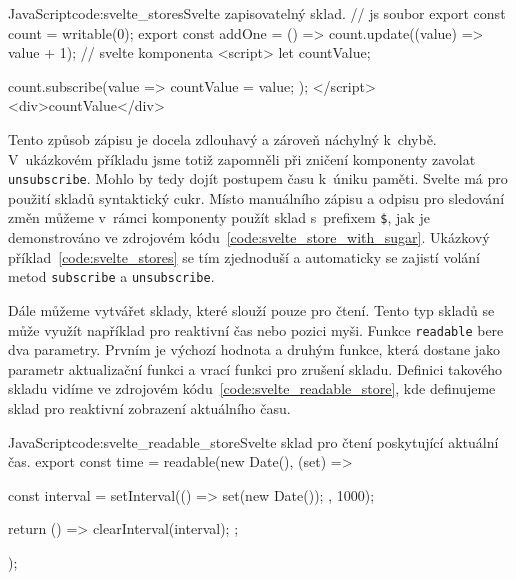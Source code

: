 \documentclass[
  master,
  program=ainf,
  printversion,
  tables=false,
  sourcecodes,
  glossaries,
  index
]{kidiplom}
\begin{document}
  \begin{kicode}{JavaScript}{code:svelte_stores}{Svelte zapisovatelný sklad.}
    // js soubor
    export const count = writable(0);
    export const addOne = () => count.update((value) => value + 1);
    // svelte komponenta
    <script>
      let countValue;

      count.subscribe(value => {
        countValue = value;
      });
    </script>
    <div>{countValue}</div>
  \end{kicode}

Tento způsob zápisu je docela zdlouhavý a zároveň náchylný k~chybě. V~ukázkovém příkladu jsme totiž zapomněli
při zničení komponenty zavolat \\{\tt unsubscribe}. Mohlo by tedy dojít postupem času k~úniku paměti. Svelte má pro
použití skladů syntaktický cukr. Místo manuálního zápisu a odpisu pro sledování změn můžeme v~rámci komponenty
použít sklad s~prefixem {\tt \$}, jak je demonstrováno ve zdrojovém kódu~\ref{code:svelte_store_with_sugar}.
Ukázkový příklad~\ref{code:svelte_stores} se tím zjednoduší a automaticky se zajistí volání metod {\tt subscribe} a {\tt unsubscribe}.


Dále můžeme vytvářet sklady, které slouží pouze pro čtení. Tento typ skladů se může využít například pro
reaktivní čas nebo pozici myši. Funkce {\tt readable} bere dva parametry. Prvním je výchozí hodnota a druhým funkce,
která dostane jako parametr aktualizační funkci a vrací funkci pro zrušení skladu. Definici takového skladu
vidíme ve zdrojovém kódu~\ref{code:svelte_readable_store}, kde definujeme sklad pro reaktivní zobrazení aktuálního času.

\begin{absolutelynopagebreak}
  \begin{kicode}{JavaScript}{code:svelte_readable_store}{Svelte sklad pro čtení poskytující aktuální čas.}
    export const time = readable(new Date(), (set) => {
      const interval = setInterval(() => {
        set(new Date());
      }, 1000);

      return () => {
        clearInterval(interval);
      };
    });
  \end{kicode}
\end{absolutelynopagebreak}
\end{document}

